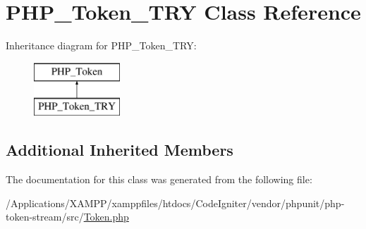 \hypertarget{class_p_h_p___token___t_r_y}{}\section{P\+H\+P\+\_\+\+Token\+\_\+\+T\+RY Class Reference}
\label{class_p_h_p___token___t_r_y}
Inheritance diagram for P\+H\+P\+\_\+\+Token\+\_\+\+T\+RY\+:\begin{figure}[H]
\begin{center}
\leavevmode
\includegraphics[height=2.000000cm]{class_p_h_p___token___t_r_y}
\end{center}
\end{figure}
\subsection*{Additional Inherited Members}


The documentation for this class was generated from the following file\+:\begin{DoxyCompactItemize}
\item 
/\+Applications/\+X\+A\+M\+P\+P/xamppfiles/htdocs/\+Code\+Igniter/vendor/phpunit/php-\/token-\/stream/src/\mbox{\hyperlink{_token_8php}{Token.\+php}}\end{DoxyCompactItemize}
